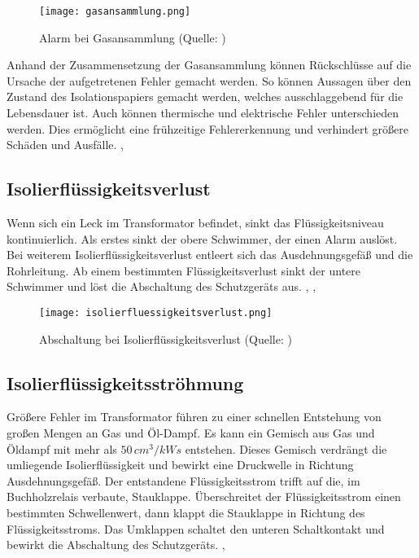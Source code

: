 \begin{figure}[h]
\centering
\texttt{[image: gasansammlung.png]}
\caption{Alarm bei Gasansammlung (Quelle: \cite[][Fig. 5]{embKatalog})}
\end{figure}

\noindent
Anhand der Zusammensetzung der Gasansammlung können Rückschlüsse auf die Ursache der aufgetretenen Fehler gemacht werden. So können Aussagen über den Zustand des Isolationspapiers gemacht werden, welches ausschlaggebend für die Lebensdauer ist. Auch können thermische und elektrische Fehler unterschieden werden. Dies ermöglicht eine frühzeitige Fehlererkennung und verhindert größere Schäden und Ausfälle.
\cite{Gockenbach2007},
\cite[][S. 33]{abbManual}

\subsection{Isolierflüssigkeitsverlust}
Wenn sich ein Leck im Transformator befindet, sinkt das Flüssigkeitsniveau kontinuierlich. Als erstes sinkt der obere Schwimmer, der einen Alarm auslöst. Bei weiterem Isolierflüssigkeitsverlust entleert sich das Ausdehnungsgefäß und die Rohrleitung. Ab einem bestimmten Flüssigkeitsverlust sinkt der untere Schwimmer und löst die Abschaltung des Schutzgeräts aus.
\cite{embKatalog},
\cite{messkoManual},
\cite[][S. 34]{abbManual}

\begin{figure}[h]
\centering
\texttt{[image: isolierfluessigkeitsverlust.png]}
\caption{Abschaltung bei Isolierflüssigkeitsverlust (Quelle: \cite[][Fig. 6]{embKatalog})}
\end{figure}

\subsection{Isolierflüssigkeitsströhmung}
Größere Fehler im Transformator führen zu einer schnellen Entstehung von großen Mengen an Gas und Öl-Dampf. Es kann ein Gemisch aus Gas und Öldampf mit mehr als \(50\,cm^3/kWs\) entstehen. Dieses Gemisch verdrängt die umliegende Isolierflüssigkeit und bewirkt eine Druckwelle in Richtung Ausdehnungsgefäß. Der entstandene Flüssigkeitsstrom trifft auf die, im Buchholzrelais verbaute, Stauklappe. Überschreitet der Flüssigkeitsstrom einen bestimmten Schwellenwert, dann klappt die Stauklappe in Richtung des Flüssigkeitsstroms. Das Umklappen schaltet den unteren Schaltkontakt und bewirkt die Abschaltung des Schutzgeräts.
\cite{embKatalog},
\cite[][S. 33]{abbManual}

